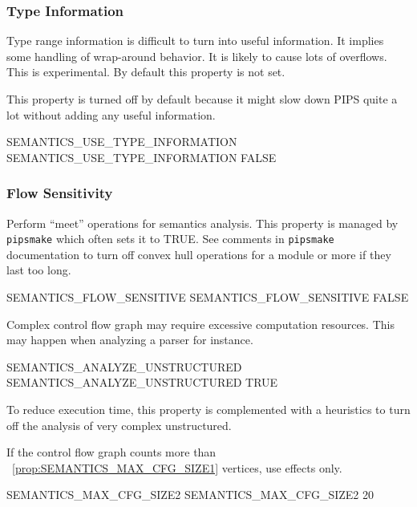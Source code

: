 \documentclass[a4paper]{report}
\newcommand{\PipsPropRef}[1]{\texttt{\detokenize{#1}}~\ref{prop:#1}}
\newcommand{\Pipsmake}{\texttt{pipsmake}}
\begin{document}
\subsubsection{Type Information}
\label{subsubsection:type-information}

Type range information is difficult to turn into useful
information. It implies some handling of wrap-around behavior. It is
likely to cause lots of overflows. This is experimental. By default
this property is not set.

This property is turned off by default because it might slow down PIPS
quite a lot without adding any useful information.

\begin{PipsProp}{SEMANTICS_USE_TYPE_INFORMATION}
SEMANTICS_USE_TYPE_INFORMATION FALSE
\end{PipsProp}

\subsubsection{Flow Sensitivity}

Perform ``meet'' operations for semantics analysis. This property is
managed by \Pipsmake{} which often sets it to TRUE. See comments in
\Pipsmake{}
documentation to turn off convex hull operations for a module or more if
they last too long.

\begin{PipsProp}{SEMANTICS_FLOW_SENSITIVE}
SEMANTICS_FLOW_SENSITIVE FALSE
\end{PipsProp}

Complex control flow graph may require excessive computation
resources. This may happen when analyzing a parser for instance.

\begin{PipsProp}{SEMANTICS_ANALYZE_UNSTRUCTURED}
SEMANTICS_ANALYZE_UNSTRUCTURED TRUE
\end{PipsProp}

To reduce execution time, this property is complemented with a heuristics
to turn off the analysis of very complex unstructured.

If the control flow graph counts more than \PipsPropRef{SEMANTICS_MAX_CFG_SIZE1}
vertices, use effects only.

\begin{PipsProp}{SEMANTICS_MAX_CFG_SIZE2}
SEMANTICS_MAX_CFG_SIZE2 20
\end{PipsProp}
\end{document}
